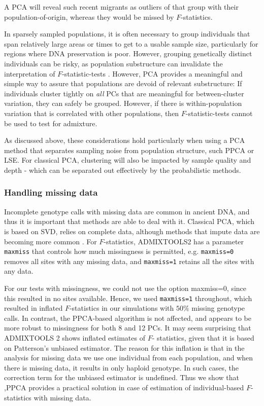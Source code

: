 \documentclass[12pt]{article}
\begin{document}
A PCA will reveal such recent migrants as outliers of that group with their population-of-origin, whereas they would be missed by $F$-statistics.

In sparsely sampled populations, it is often necessary to group individuals that span relatively large areas or times to get to a usable sample size, particularly for regions where DNA preservation is poor. However, grouping genetically distinct individuals can be risky, as population substructure can invalidate the interpretation of $F$-statistic-tests \citep{peter_admixture_2016}. However, PCA provides a meaningful and simple way to assure that populations are devoid of relevant substructure: If individuals  cluster tightly on \emph{all} PCs that are meaningful for between-cluster variation, they can safely be grouped. However, if there is within-population variation that is correlated with other populations, then $F$-statistic-tests cannot be used to test for admixture. 

As discussed above, these considerations hold particularly when using a PCA method that separates sampling noise from population structure, such PPCA or LSE. For classical PCA, clustering will also be impacted by sample quality and depth - which can be separated out effectively by the probabilistic methods.



\subsubsection{Handling missing data}
Incomplete genotype calls with missing data are common in ancient DNA, and thus it is important that methods are able to deal with it. Classical PCA, which is based on SVD, relies on complete data, although methods that impute data are becoming more common \citep{meisner_large-scale_2021}. For $F$-statistics, ADMIXTOOLS2 has a parameter \texttt{maxmiss} that controls how much missingness is permitted, e.g. \texttt{maxmiss=0} removes all sites with any missing data, and \texttt{maxmiss=1} retains all the sites with any data.

For our tests with missingness, we could not use the option maxmiss=0, since this resulted in no sites available. Hence, we used \texttt{maxmiss=1} throughout, which resulted in inflated $F$-statistics in our simulations with $50\%$ missing genotype calls. In contrast, the PPCA-based algorithm is not affected, and appears to be more robust to missingness for both 8 and 12 PCs. It may seem surprising that ADMIXTOOLS 2 shows inflated estimates of $F$- statistics, given that it is based on Patterson's unbiased estimator. The reason for this inflation is that in the analysis for missing data we use one individual from each population, and when there is missing data, it results in only haploid genotype. In such cases, the correction term for the unbiased estimator is undefined. Thus we show that ,PPCA provides a practical solution in case of estimation of individual-based $F$-statistics with missing data. 
\end{document}
